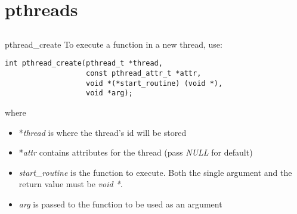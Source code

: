 \section{pthreads}
\subsection{}
\begin{frame}[fragile = singleslide]{pthread\_create}
    To execute a function in a new thread, use:
    \begin{lstlisting}[numbers=none]
int pthread_create(pthread_t *thread,
                   const pthread_attr_t *attr,
                   void *(*start_routine) (void *),
                   void *arg);
\end{lstlisting}
    where
    \begin{itemize}
	    	\item *\textit{thread} is where the thread's id will be stored
	    	\item *\textit{attr} contains attributes for the thread (pass \textit{NULL} for default)
	    	\item \textit{start\_routine} is the function to execute. Both the single argument and the return value must be \textit{void *}.
	    	\item \textit{arg} is passed to the function to be used as an argument
    \end{itemize}
\end{frame}

